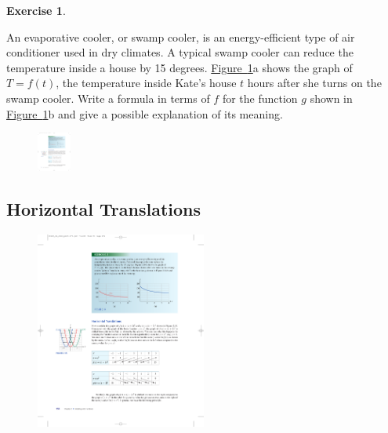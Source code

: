 \documentclass[10pt,]{book}
\theoremstyle{plain}
\theoremstyle{definition}
\theoremstyle{definition}
\theoremstyle{definition}
\theoremstyle{definition}
\theoremstyle{definition}
\newtheorem{exercise}[theorem]{Exercise}
\numberwithin{equation}{section}
\begin{document}
\begin{exercise}\label{exercise-swamp-cooler}

    An evaporative cooler, or swamp cooler, is an energy-efficient type of air conditioner used in dry climates. A typical swamp cooler can reduce the temperature inside a house by 15 degrees. \hyperref[fig-swamp-cooler]{Figure~\ref{fig-swamp-cooler}}a shows the graph of \(T = f (t)\), the temperature inside Kate’s house \(t\) hours after she turns on the swamp cooler. Write a formula in terms of \(f\) for the function \(g\) shown in \hyperref[fig-swamp-cooler]{Figure~\ref{fig-swamp-cooler}}b and give a possible explanation of its meaning.
    \leavevmode%
\begin{figure}
\centering
\includegraphics[width=0.100\textwidth,]{images/fig-swamp-cooler.pdf}\caption{\label{fig-swamp-cooler}}
\end{figure}
\end{exercise}
\typeout{************************************************}
\typeout{************************************************}
\subsection[Horizontal Translations]{Horizontal Translations}\label{subsection-43}
\leavevmode%
\begin{figure}
\centering
\includegraphics[width=0.50\textwidth,]{images/fig-translate-parabs.pdf}\caption{\label{fig-translate-parabs}}
\end{figure}
\end{document}
